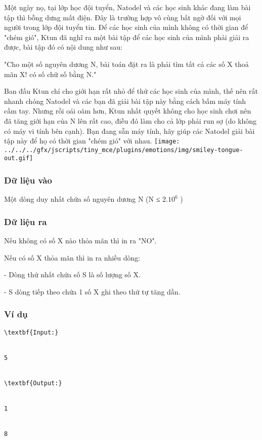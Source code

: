



   Một ngày nọ, tại lớp học đội tuyển, Natodel và các học sinh khác đang làm bài tập thì bỗng dưng mất điện. Đây là trường hợp vô cùng bất ngờ đối với mọi người trong lớp đội tuyển tin. Để các học sinh của mình không có thời gian để "chém gió", Ktun đã nghĩ ra một bài tập để các học sinh của mình phải giải ra được, bài tập đó có nội dung như sau:  

   "Cho một số nguyên dương N, bài toán đặt ra là phải tìm tất cả các số X thoả mãn X! có số chữ số bằng N."  

   Ban đầu Ktun chỉ cho giới hạn rất nhỏ để thử các học sinh của mình, thế nên rất nhanh chóng Natodel và các bạn đã giải bài tập này bằng cách bấm máy tính cầm tay. Nhưng rồi oái oăm hơn, Ktun nhất quyết không cho học sinh chơi nên đã tăng giới hạn của N lên rất cao, điều đó làm cho cả lớp phải run sợ (do không có máy vi tính bên cạnh). Bạn đang sẵn máy tính, hãy giúp các Natodel giải bài tập này để họ có thời gian "chém gió" với nhau.   
\texttt{[image: ../../../gfx/jscripts/tiny\_mce/plugins/emotions/img/smiley-tongue-out.gif]}

\subsubsection{   Dữ liệu vào  }

   Một dòng duy nhất chứa số nguyên dương N (N ≤ 2.$10^{6}$   )  

\subsubsection{   Dữ liệu ra  }

   Nếu không có số X nào thỏa mãn thì in ra "NO".  

   Nếu có số X thỏa mãn thì in ra nhiều dòng:   


   - Dòng thứ nhất chứa số S là số lượng số X.   


   - S dòng tiếp theo chứa 1 số X ghi theo thứ tự tăng dần.  

\subsubsection{   Ví dụ  }
\begin{verbatim}
\textbf{Input:}


5


\textbf{Output:}


1


8\end{verbatim}
